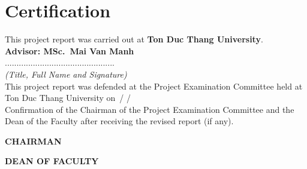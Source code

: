 \chapter*{Certification}


This project report was carried out at \textbf{Ton Duc Thang University}.\\[0.5em]
\textbf{Advisor: MSc.~Mai Van Manh}\\[2em]

...............................................\\
\textit{(Title, Full Name and Signature)}\\[3em]

This project report was defended at the Project Examination Committee
held at Ton Duc Thang University on \dotfill\,/\,\dotfill\,/\,\dotfill\\[3em]

Confirmation of the Chairman of the Project Examination Committee
and the Dean of the Faculty after receiving the revised report (if any).\\[3em]

\noindent
\begin{minipage}[t]{0.48\textwidth}
  \centering
  \textbf{CHAIRMAN}\\[5em]
  \dotfill
\end{minipage}\hfill
\begin{minipage}[t]{0.48\textwidth}
  \centering
  \textbf{DEAN OF FACULTY}\\[5em]
  \dotfill
\end{minipage}
